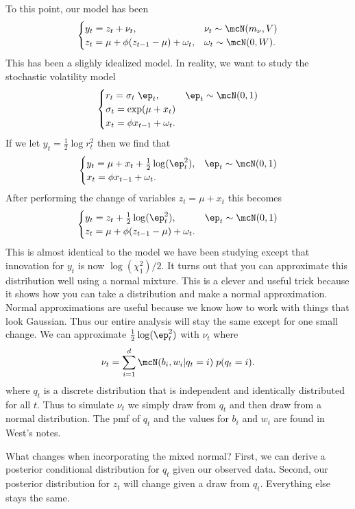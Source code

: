 \documentclass{article}
\begin{document}
To this point, our model has been
\[
\begin{cases}
y_t = z_t + \nu_t, & \nu_t \sim \mcN(m_\nu, V) \\
z_t = \mu + \phi (z_{t-1} - \mu) + \omega_t, & \omega_t \sim \mcN(0, W).
\end{cases}
\]
This has been a slighly idealized model.  In reality, we want to study the stochastic volatility model
\[
\begin{cases}
r_t = \sigma_t \; \ep_t, & \ep_t \sim \mcN(0,1) \\
\sigma_t = \exp(\mu + x_t) \\
x_t = \phi x_{t-1} + \omega_t.
\end{cases}
\]
If we let $y_t = \frac{1}{2} \log r_t^2$ then we find that
\[
\begin{cases}
y_t = \mu + x_t + \frac{1}{2}\log(\ep_t^2), & \ep_t \sim \mcN(0,1) \\
x_t = \phi x_{t-1} + \omega_t.
\end{cases}
\]
After performing the change of variables $z_t = \mu + x_t$ this becomes
\[
\begin{cases}
y_t = z_t + \frac{1}{2}\log(\ep_t^2), & \ep_t \sim \mcN(0,1) \\
z_t = \mu + \phi (z_{t-1} - \mu) + \omega_t.
\end{cases}
\]
This is almost identical to the model we have been studying except that innovation for $y_t$ is now $\log(\chi^2_1)/2$.  It turns out that you can approximate this distribution well using a normal mixture.  This is a clever and useful trick because it shows how you can take a distribution and make a normal approximation.  Normal approximations are useful because we know how to work with things that look Gaussian.  Thus our entire analysis will stay the same except for one small change.  We can approximate $\frac{1}{2}\log(\ep_t^2)$ with $\nu_t$ where
\[
\nu_t = \sum_{i=1}^d \mcN(b_i, w_i | q_t = i) \; p(q_t = i).
\]
where $q_t$ is a discrete distribution that is independent and identically distributed for all $t$.  Thus to simulate $\nu_t$ we simply draw from $q_t$ and then draw from a normal distribution.  The pmf of $q_t$ and the values for $b_i$ and $w_i$ are found in West's notes.

What changes when incorporating the mixed normal?  First, we can derive a posterior conditional distribution for $q_t$ given our observed data.  Second, our posterior distribution for $z_t$ will change given a draw from $q_t$.  Everything else stays the same.
\end{document}
